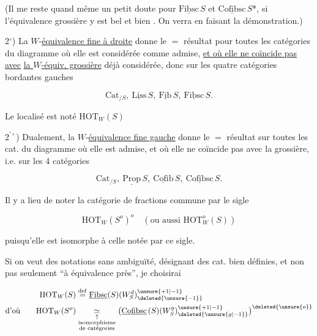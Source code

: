 (Il me reste quand même un petit doute pour $\underline{\mathrm{Fibsc}}\,S$ et $\underline{\mathrm{Cofibsc}}\,S$*, si l'équivalence grossière y est bel et bien . On verra en faisant la démonstration.)


2$^\circ$) La $W$-\uline{équivalence fine à droite} donne le $=$ résultat pour toutes les catégories du diagramme où elle est considérée comme admise,  \uline{et où elle ne coïncide pas} \uline{avec} \uline{la $W$-équiv. grossière} déjà considérée, donc sur les quatre catégories bordantes gauches

\[
 \mathrm{Cat}_{/S},\ \underline{\mathrm{Liss}}\,S,\ \underline{\mathrm{Fib}}\,S,\ \underline{\mathrm{Fibsc}}\,S.
\]


Le localisé est noté $\boxed{\mathrm{HOT}_W(S)}$

$2^{'\circ}$) Dualement, la $W$-\uline{équivalence fine gauche} donne le $=$ résultat sur toutes les cat. du diagramme où elle est admise, et où elle ne coïncide pas avec la grossière, i.e. sur les 4 catégories

\[
 \mathrm{Cat}_{/S},\ \underline{\mathrm{Prop}}\,S,\ \underline{\mathrm{Cofib}}\,S,\ \underline{\mathrm{Cofibsc}}\,S.
\]

Il y a lieu de noter la catégorie de fractions commune par le sigle

\[
 \mathrm{HOT}_W(S^o)^o \quad(\text{ou aussi }\mathrm{HOT}^o_W(S))
\]

puisqu'elle est isomorphe à celle notée par ce sigle.

Si on veut des notations sans ambiguïté, désignant des cat. bien définies, et non pas seulement ``à équivalence près'', je choisirai

\[
 \begin{aligned}
 \mathrm{HOT}_W(S)&\overset{\mathrm{def}}{=}\underline{\mathrm{Fibsc}}(S)(W^d_S)_{\deleted{\unsure{-1}}}^{\unsure{+1|-1}}\\
 \text{d'où}\qquad \mathrm{HOT}_W(S^o)&\underset{\substack{\uparrow\\\text{isomorphisme}\\\text{de catégories}}}{\simeq}
 \bigl(\underline{\mathrm{Cofibsc}}\,(S)(W^g_S)_{\deleted{\unsure{g|-1}}}^{\unsure{+1|-1}}\bigr)^{\deleted{\unsure{o}}}
 \end{aligned}
\]

